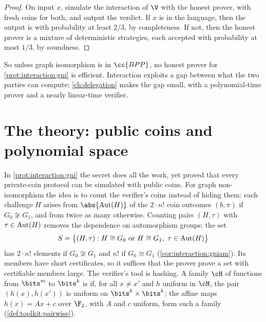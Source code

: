 \begin{refsection}

\begin{proof}
On input $x$, simulate the interaction of $\V$ with the honest prover, with fresh coins for both, and output the verdict. If $x$ is in the language, then the output is \acc{} with probability at least $2/3$, by completeness. If not, then the honest prover is a mixture of deterministic strategies, each accepted with probability at most $1/3$, by soundness.
\end{proof}

So unless graph isomorphism is in $\cc{BPP}$, no honest prover for \cref{prot:interaction:gni} is efficient. Interaction exploits a gap between what the two parties can compute; \cref{ch:delegation} makes the gap small, with a polynomial-time prover and a nearly linear-time verifier.

\section{The theory: public coins and polynomial space}\label{sec:interaction:public}

In \cref{prot:interaction:gni} the secret does all the work, yet \textcite{GoldwasserSipser1986} proved that every private-coin protocol can be simulated with public coins. For graph non-isomorphism the idea is to count the verifier's coins instead of hiding them: each challenge $H$ arises from $\abs{\interactionaut(H)}$ of the $2\cdot n!$ coin outcomes $(b,\pi)$ if $G_0\not\cong G_1$, and from twice as many otherwise. Counting pairs $(H,\tau)$ with $\tau\in\operatorname{Aut}(H)$ removes the dependence on automorphism groups: the set
\begin{equation}\label{eq:interaction:S}
  S=\bigl\{(H,\tau):H\cong G_0\text{ or }H\cong G_1,\ \tau\in\interactionaut(H)\bigr\}
\end{equation}
has $2\cdot n!$ elements if $G_0\not\cong G_1$ and $n!$ if $G_0\cong G_1$ (\cref{cor:interaction:gniam}). Its members have short certificates, so it suffices that the prover prove a set with certifiable members large. The verifier's tool is hashing. A family $\cH$ of functions from $\bits^m$ to $\bits^k$ is  if, for all $x\ne x'$ and $h$ uniform in $\cH$, the pair $(h(x),h(x'))$ is uniform on $\bits^k\times\bits^k$; the affine maps $h(x)=Ax+c$ over $\F_2$, with $A$ and $c$ uniform, form such a family (\cref{def:toolkit:pairwise}).


\end{refsection}

